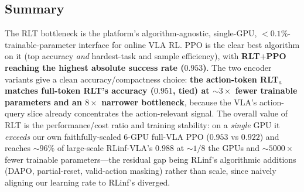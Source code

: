 \subsection{Summary}
The RLT bottleneck is the platform's algorithm-agnostic, single-GPU, $<0.1\%$-trainable-parameter interface for online VLA RL. PPO is the clear best algorithm on it (top accuracy \emph{and} hardest-task and sample efficiency), with \textbf{RLT$+$PPO reaching the highest absolute success rate ($0.953$)}. The two encoder variants give a clean accuracy/compactness choice: \textbf{the action-token RLT$_a$ matches full-token RLT's accuracy ($0.951$, tied) at ${\sim}3\times$ fewer trainable parameters and an $8\times$ narrower bottleneck}, because the VLA's action-query slice already concentrates the action-relevant signal. The overall value of RLT is the performance/cost ratio and training stability: on a \emph{single} GPU it \emph{exceeds} our own faithfully-scaled $6$-GPU full-VLA PPO ($0.953$ vs $0.922$) and reaches ${\sim}96\%$ of large-scale RLinf-VLA's $0.988$ at ${\sim}1/8$ the GPUs and ${\sim}5000\times$ fewer trainable parameters---the residual gap being RLinf's algorithmic additions (DAPO, partial-reset, valid-action masking) rather than scale, since naively aligning our learning rate to RLinf's diverged.
